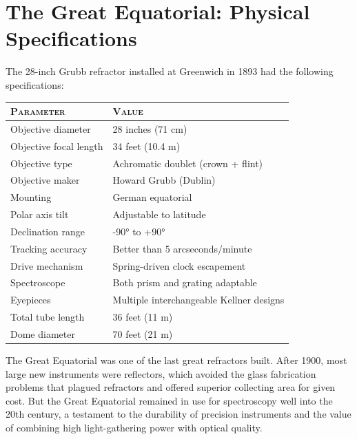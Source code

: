 \section{The Great Equatorial: Physical Specifications}

The 28-inch Grubb refractor installed at Greenwich in 1893 had the following specifications:

\begin{center}
\begin{tabular}{ll}
\hline
\textsc{Parameter} & \textsc{Value} \\
\hline
Objective diameter & 28 inches (71 cm) \\
Objective focal length & 34 feet (10.4 m) \\
Objective type & Achromatic doublet (crown + flint) \\
Objective maker & Howard Grubb (Dublin) \\
Mounting & German equatorial \\
Polar axis tilt & Adjustable to latitude \\
Declination range & -90° to +90° \\
Tracking accuracy & Better than 5 arcseconds/minute \\
Drive mechanism & Spring-driven clock escapement \\
Spectroscope & Both prism and grating adaptable \\
Eyepieces & Multiple interchangeable Kellner designs \\
Total tube length & 36 feet (11 m) \\
Dome diameter & 70 feet (21 m) \\
\hline
\end{tabular}
\end{center}

The Great Equatorial was one of the last great refractors built. After 1900, most large new instruments were reflectors, which avoided the glass fabrication problems that plagued refractors and offered superior collecting area for given cost. But the Great Equatorial remained in use for spectroscopy well into the 20th century, a testament to the durability of precision instruments and the value of combining high light-gathering power with optical quality.
